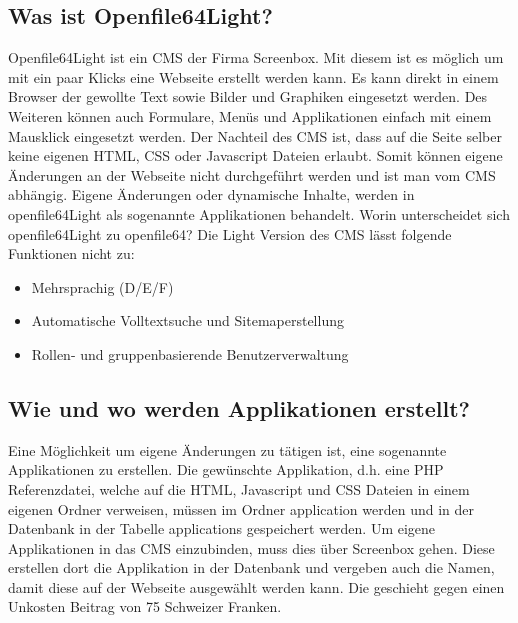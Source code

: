 \documentclass[a4paper,ngerman, 11pt]{report}
\begin{document}
  
\subsection{Was ist Openfile64Light?}
Openfile64Light ist ein CMS der Firma Screenbox. Mit diesem ist es möglich um mit ein paar Klicks eine Webseite erstellt werden kann. Es kann direkt in einem Browser der gewollte Text sowie Bilder und Graphiken eingesetzt werden. Des Weiteren können auch Formulare, Menüs und Applikationen einfach mit einem Mausklick eingesetzt werden. Der Nachteil des CMS ist, dass auf die Seite selber keine eigenen HTML, CSS oder Javascript Dateien erlaubt. Somit können eigene Änderungen an der Webseite nicht durchgeführt werden und ist man vom CMS abhängig. Eigene Änderungen oder dynamische Inhalte, werden in openfile64Light als sogenannte Applikationen behandelt. Worin unterscheidet sich openfile64Light zu openfile64? Die Light Version des CMS lässt folgende Funktionen nicht zu:
\begin{itemize}
\item Mehrsprachig (D/E/F)
\item Automatische Volltextsuche und Sitemaperstellung
\item Rollen- und gruppenbasierende Benutzerverwaltung
\end{itemize}


\subsection{Wie und wo werden Applikationen erstellt?}
Eine Möglichkeit um eigene Änderungen zu tätigen ist, eine sogenannte Applikationen zu erstellen. Die gewünschte Applikation, d.h. eine PHP Referenzdatei, welche auf die HTML, Javascript und CSS Dateien in einem eigenen Ordner verweisen, müssen im Ordner application werden und in der Datenbank in der Tabelle applications gespeichert werden. Um eigene Applikationen in das CMS einzubinden, muss dies über Screenbox gehen. Diese erstellen dort die Applikation in der Datenbank und vergeben auch die Namen, damit diese auf der Webseite ausgewählt werden kann. Die geschieht gegen einen Unkosten Beitrag von 75 Schweizer Franken.
\end{document}
